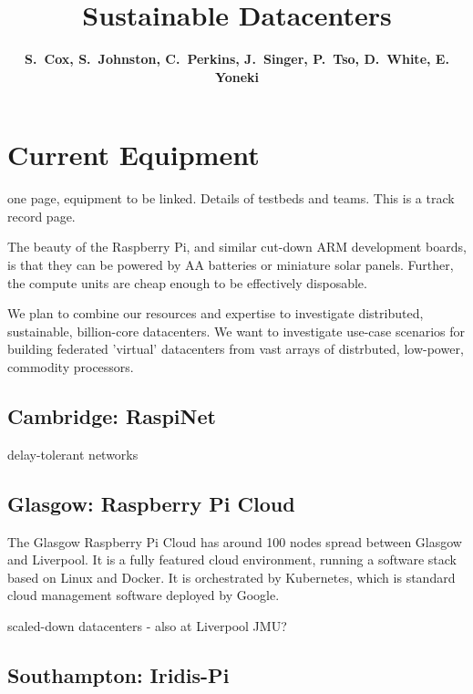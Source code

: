 \documentclass[a4paper,11pt]{article}
\begin{document}
\title{\Large \bfseries Sustainable Datacenters \vspace{-4mm}}
\author{\vspace{-5mm} \textbf{\normalsize S.\ Cox, S.\ Johnston, C.\ Perkins, J.\ Singer,  P.\ Tso, D.\ White, E. Yoneki}}
\date{\vspace{-6mm}}
\maketitle
\vspace{-5mm}
%
%
\section{Current Equipment}

one page, equipment to be linked.
Details of testbeds and teams. This is a track record page.

The beauty of the Raspberry Pi, and similar cut-down ARM development boards, is that they can be powered by AA batteries or miniature solar panels. Further, the compute units are cheap enough to be effectively disposable.

We plan to combine our resources and expertise to investigate distributed, sustainable, billion-core datacenters.
We want to investigate use-case scenarios for building federated 'virtual' datacenters from vast arrays of distrbuted, low-power, commodity processors.


\subsection{Cambridge: RaspiNet}

delay-tolerant networks
\cite{yoneki2014raspinet}

\subsection{Glasgow: Raspberry Pi Cloud}

The Glasgow Raspberry Pi Cloud has around 100 nodes spread between Glasgow and Liverpool. It is a fully featured cloud environment, running a software stack based on Linux and Docker. It is orchestrated by Kubernetes, which is standard cloud management software deployed by Google. 

scaled-down datacenters
\cite{tso2013glasgow}
- also at Liverpool JMU?


\subsection{Southampton: Iridis-Pi}
\end{document}
